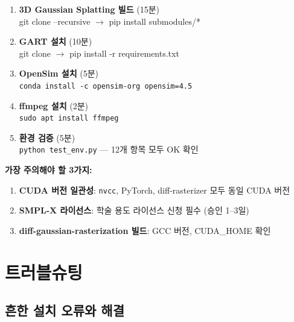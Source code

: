 \documentclass[11pt, a4paper]{report}
\begin{document}
\begin{summary}[title={전체 설치 순서 (약 2--3시간)}]
\begin{enumerate}[leftmargin=*]
  \item \textbf{3D Gaussian Splatting 빌드} (15분)\\
        git clone --recursive $\rightarrow$ pip install submodules/*

  \item \textbf{GART 설치} (10분)\\
        git clone $\rightarrow$ pip install -r requirements.txt

  \item \textbf{OpenSim 설치} (5분)\\
        \texttt{conda install -c opensim-org opensim=4.5}

  \item \textbf{ffmpeg 설치} (2분)\\
        \texttt{sudo apt install ffmpeg}

  \item \textbf{환경 검증} (5분)\\
        \texttt{python test\_env.py} --- 12개 항목 모두 OK 확인
\end{enumerate}
\end{summary}


\begin{keyidea}
\textbf{가장 주의해야 할 3가지:}
\begin{enumerate}[nosep]
  \item \textbf{CUDA 버전 일관성}: \texttt{nvcc}, PyTorch, diff-rasterizer 모두 동일 CUDA 버전
  \item \textbf{SMPL-X 라이선스}: 학술 용도 라이선스 신청 필수 (승인 1--3일)
  \item \textbf{diff-gaussian-rasterization 빌드}: GCC 버전, CUDA\_HOME 확인
\end{enumerate}
\end{keyidea}


\appendix

\chapter{트러블슈팅}

\section{흔한 설치 오류와 해결}
\end{document}
